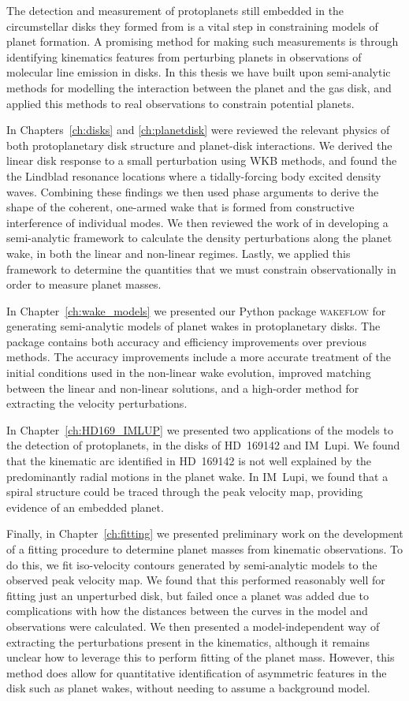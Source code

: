 The detection and measurement of protoplanets still embedded in the circumstellar disks they formed from is a vital step in constraining models of planet formation.
A promising method for making such measurements is through identifying kinematics features from perturbing planets in observations of molecular line emission in disks.
In this thesis we have built upon semi-analytic methods for modelling the interaction between the planet and the gas disk, and applied this methods to real observations to constrain potential planets.

In Chapters~\ref{ch:disks} and \ref{ch:planetdisk} were reviewed the relevant physics of both protoplanetary disk structure and planet-disk interactions.
We derived the linear disk response to a small perturbation using WKB methods, and found the the Lindblad resonance locations where a tidally-forcing body excited density waves.
Combining these findings we then used phase arguments to derive the shape of the coherent, one-armed wake that is formed from constructive interference of individual modes.
We then reviewed the work of \citet{goodman2001,rafikov2002a} in developing a semi-analytic framework to calculate the density perturbations along the planet wake, in both the linear and non-linear regimes.
Lastly, we applied this framework to determine the quantities that we must constrain observationally in order to measure planet masses.

In Chapter~\ref{ch:wake_models} we presented our Python package \textsc{wakeflow} for generating semi-analytic models of planet wakes in protoplanetary disks.
The package contains both accuracy and efficiency improvements over previous methods.
The accuracy improvements include a more accurate treatment of the initial conditions used in the non-linear wake evolution, improved matching between the linear and non-linear solutions, and a high-order method for extracting the velocity perturbations.

In Chapter~\ref{ch:HD169_IMLUP} we presented two applications of the models to the detection of protoplanets, in the disks of HD~169142 and IM~Lupi.
We found that the kinematic arc identified in HD~169142 is not well explained by the predominantly radial motions in the planet wake.
In IM~Lupi, we found that a spiral structure could be traced through the peak velocity map, providing evidence of an embedded planet.

Finally, in Chapter~\ref{ch:fitting} we presented preliminary work on the development of a fitting procedure to determine planet masses from kinematic observations.
To do this, we fit iso-velocity contours generated by semi-analytic models to the observed peak velocity map.
We found that this performed reasonably well for fitting just an unperturbed disk, but failed once a planet was added due to complications with how the distances between the curves in the model and observations were calculated.
We then presented a model-independent way of extracting the perturbations present in the kinematics, although it remains unclear how to leverage this to perform fitting of the planet mass.
However, this method does allow for quantitative identification of asymmetric features in the disk such as planet wakes, without needing to assume a background model.

